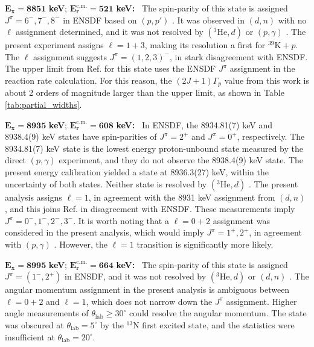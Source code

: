 \emph{$\mathbf{E_{x} = 8851}$} \textbf{keV}; \emph{$\mathbf{E^{\boldsymbol{\mathrm{c.m.}}}_{r} = 521}$} \textbf{keV:} \, 
The spin-parity of this state is assigned $J^{\pi} = 6^{-}, 7^{-}, 8^{-}$ in ENSDF based on $(p, p')$ \cite{Gruhn1972}. It was observed in $(d, n)$ \cite{Fuchs1969} with no $\ell$ assignment determined, and it was not resolved by $(^{3}\mathrm{He},d)$ \cite{Erskine1966,Seth1967,Cage1971} or $(p,\gamma)$ \cite{Kikstra1990,Cheng1981,Leenhouts1966}. The present experiment assigns $\ell=1+3$, making its resolution a first for $^{39}\mathrm{K}+p$. The $\ell$ assignment suggests $J^{\pi} = (1, 2, 3)^{-}$, in stark disagreement with ENSDF. The upper limit from Ref. \cite{Longland2018} for this state uses the ENSDF $J^{\pi}$ assignment in the reaction rate calculation. For this reason, the $(2J+1)\Gamma_{p}$ value from this work is about 2 orders of magnitude larger than the upper limit, as shown in Table \ref{tab:partial_widths}.

\emph{$\mathbf{E_{x} = 8935}$} \textbf{keV}; \emph{$\mathbf{E^{\boldsymbol{\mathrm{c.m.}}}_{r} = 608}$} \textbf{keV:} \, 
In ENSDF, the 8934.81(7) keV and 8938.4(9) keV states have spin-parities of $J^{\pi} = 2^{+}$ and $J^{\pi} = 0^{+}$, respectively. The 8934.81(7) keV state is the lowest energy proton-unbound state measured by the direct $(p,\gamma)$ \cite{Kikstra1990} experiment, and they do not observe the 8938.4(9) keV state. The present energy calibration yielded a state at 8936.3(27) keV, within the uncertainty of both states. Neither state is resolved by $(^{3}\mathrm{He},d)$ \cite{Erskine1966,Seth1967,Cage1971}. The present analysis assigns $\ell=1$, in agreement with the 8931 keV assignment from $(d,n)$ \cite{Fuchs1969}, and this joins Ref. \cite{Fuchs1969} in disagreement with ENSDF. These measurements imply $J^{\pi} = 0^{-},1^{-},2^{-},3^{-}$. It is worth noting that a $\ell=0+2$ assignment was considered in the present analysis, which would imply $J^{\pi} = 1^{+},2^{+}$, in agreement with $(p,\gamma)$ \cite{Kikstra1990}. However, the $\ell=1$ transition is significantly more likely.

\emph{$\mathbf{E_{x} = 8995}$} \textbf{keV}; \emph{$\mathbf{E^{\boldsymbol{\mathrm{c.m.}}}_{r} = 664}$} \textbf{keV:} \, 
The spin-parity of this state is assigned $J^{\pi} = (1^{-},2^{+})$ in ENSDF, and it was not resolved by $(^{3}\mathrm{He},d)$ \cite{Erskine1966,Seth1967,Cage1971} or $(d,n)$ \cite{Fuchs1969}. The angular momentum assignment in the present analysis is ambiguous between $\ell=0+2$ and $\ell=1$, which does not narrow down the $J^{\pi}$ assignment. Higher angle measurements of $\theta_{\mathrm{lab}} \geq 30^{\circ}$ could resolve the angular momentum. The state was obscured at $\theta_{\mathrm{lab}} = 5^{\circ}$ by the $^{13}$N first excited state, and the statistics were insufficient at $\theta_{\mathrm{lab}} = 20^{\circ}$.

